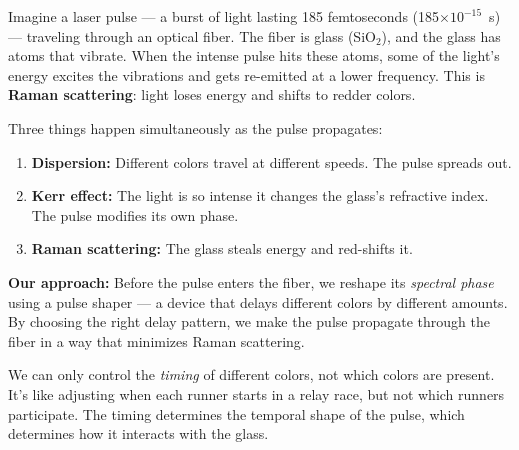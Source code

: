 \documentclass[12pt,a4paper]{article}
\begin{document}
Imagine a laser pulse --- a burst of light lasting 185 femtoseconds (185$\times 10^{-15}$~s) --- traveling through an optical fiber. The fiber is glass (SiO$_2$), and the glass has atoms that vibrate. When the intense pulse hits these atoms, some of the light's energy excites the vibrations and gets re-emitted at a lower frequency. This is \textbf{Raman scattering}: light loses energy and shifts to redder colors.

Three things happen simultaneously as the pulse propagates:
\begin{enumerate}
    \item \textbf{Dispersion:} Different colors travel at different speeds. The pulse spreads out.
    \item \textbf{Kerr effect:} The light is so intense it changes the glass's refractive index. The pulse modifies its own phase.
    \item \textbf{Raman scattering:} The glass steals energy and red-shifts it.
\end{enumerate}

\textbf{Our approach:} Before the pulse enters the fiber, we reshape its \emph{spectral phase} using a pulse shaper --- a device that delays different colors by different amounts. By choosing the right delay pattern, we make the pulse propagate through the fiber in a way that minimizes Raman scattering.

\begin{intuition}
We can only control the \emph{timing} of different colors, not which colors are present. It's like adjusting when each runner starts in a relay race, but not which runners participate. The timing determines the temporal shape of the pulse, which determines how it interacts with the glass.
\end{intuition}
\end{document}
